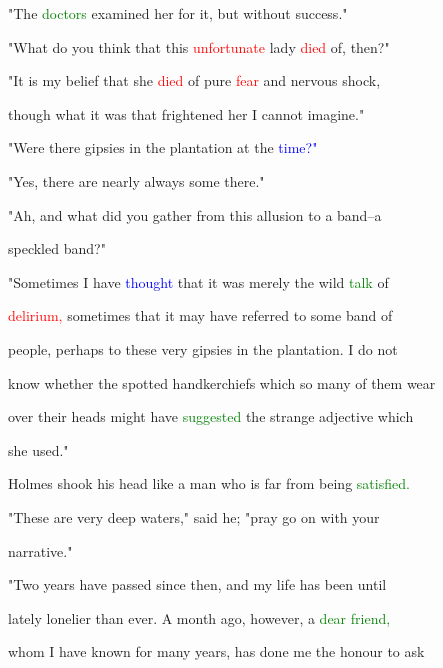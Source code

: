  "The \textcolor{green}{doctors} examined her for it, but without \textcolor{BurntOrange}{success."}



 "What do you think that this \textcolor{red}{unfortunate} lady \textcolor{red}{died} of, then?"



 "It is my belief that she \textcolor{red}{died} of pure \textcolor{red}{fear} and \textcolor{BurntOrange}{nervous} \textcolor{BurntOrange}{shock,}

 though what it was that \textcolor{BurntOrange}{frightened} her I cannot imagine."



 "Were there gipsies in the plantation at the \textcolor{blue}{time?"}



 "Yes, there are nearly always some there."



 "Ah, and what did you gather from this allusion to a band--a

 speckled band?"



 "Sometimes I have \textcolor{blue}{thought} that it was merely the \textcolor{BurntOrange}{wild} \textcolor{green}{talk} of

 \textcolor{red}{delirium,} sometimes that it may have referred to some band of

 people, perhaps to these very gipsies in the plantation. I do not

 know whether the spotted handkerchiefs which so many of them \textcolor{BurntOrange}{wear}

 over their heads might have \textcolor{green}{suggested} the strange adjective which

 she used."



 Holmes shook his head like a man who is far from being \textcolor{green}{satisfied.}



 "These are very deep waters," said he; \textcolor{BurntOrange}{"pray} go on with your

 narrative."



 "Two years have passed since then, and my life has been until

 lately lonelier than ever. A month ago, however, a \textcolor{green}{dear} \textcolor{green}{friend,}

 whom I have known for many years, has done me the honour to ask

